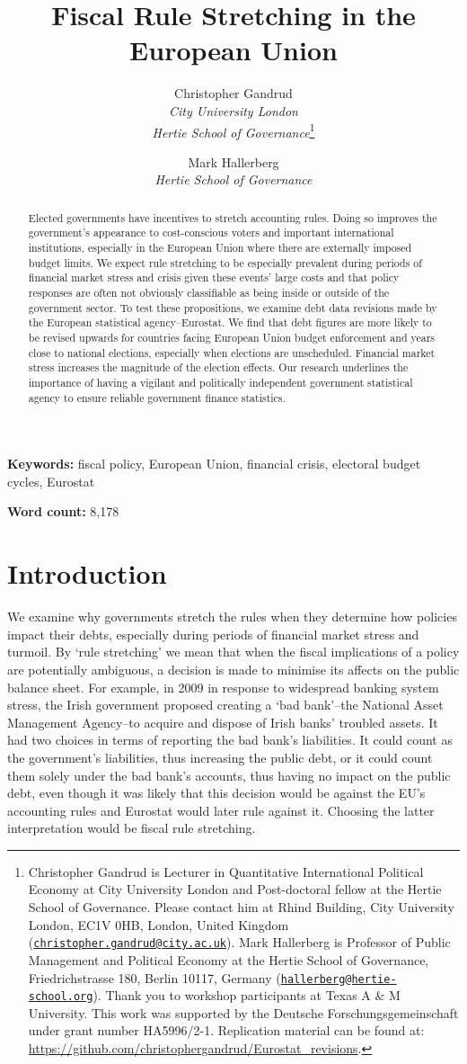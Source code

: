 \documentclass[]{article}
\title{Fiscal Rule Stretching in the European Union}
\author{Christopher Gandrud \\ \emph{City University London} \\ \emph{Hertie School of Governance}\footnote{Christopher Gandrud is Lecturer in Quantitative International Political Economy at City University London and Post-doctoral fellow at the Hertie School of Governance. Please contact him at Rhind Building, City University London, EC1V 0HB, London, United Kingdom
(\href{mailto:christopher.gandrud@city.ac.uk}{\nolinkurl{christopher.gandrud@city.ac.uk}}). Mark Hallerberg is Professor of Public Management and Political Economy at the Hertie School of Governance, Friedrichstrasse 180, Berlin 10117, Germany (\href{mailto:hallerberg@hertie-school.org}{\nolinkurl{hallerberg@hertie-school.org}}). Thank you to workshop participants at Texas A \& M University. This work was supported by the Deutsche Forschungsgemeinschaft under grant number HA5996/2-1. Replication material can be found at: \url{https://github.com/christophergandrud/Eurostat_revisions}.}
\and
Mark Hallerberg \\ \emph{Hertie School of Governance}}
\begin{document}
\maketitle


\begin{abstract}
Elected governments have incentives to stretch accounting rules. Doing so improves the government’s appearance to cost-conscious voters and important international institutions, especially in the European Union where there are externally imposed budget limits. We expect rule stretching to be especially prevalent during periods of financial market stress and crisis given these events' large costs and that policy responses are often not obviously classifiable as being inside or outside of the government sector. To test these propositions, we examine debt data revisions made by the European statistical agency--Eurostat. We find that debt figures are more likely to be revised upwards for countries facing European Union budget enforcement and years close to national elections, especially when elections are unscheduled. Financial market stress increases the magnitude of the election effects. Our research underlines the importance of having a vigilant and politically independent government statistical agency to ensure reliable government finance statistics.
\end{abstract}


\textbf{Keywords:} fiscal policy, European Union, financial crisis, electoral budget cycles, Eurostat

\textbf{Word count:} 8,178

\pagebreak

\section{Introduction}

We examine why governments stretch the rules when they determine how policies impact their debts, especially during periods of financial market stress and turmoil. By `rule stretching' we mean that when the fiscal implications of a policy are potentially ambiguous, a decision is made to minimise its affects on the public balance sheet. For example, in 2009 in response to widespread banking system stress, the Irish government proposed creating a `bad bank'--the National Asset Management Agency--to acquire and dispose of Irish banks' troubled assets. It had two choices in terms of reporting the bad bank's liabilities. It could count as the government's liabilities, thus increasing the public debt, or it could count them solely under the bad bank's accounts, thus having no impact on the public debt, even though it was likely that this decision would be against the EU's accounting rules and Eurostat would later rule against it. Choosing the latter interpretation would be fiscal rule stretching.
\end{document}
